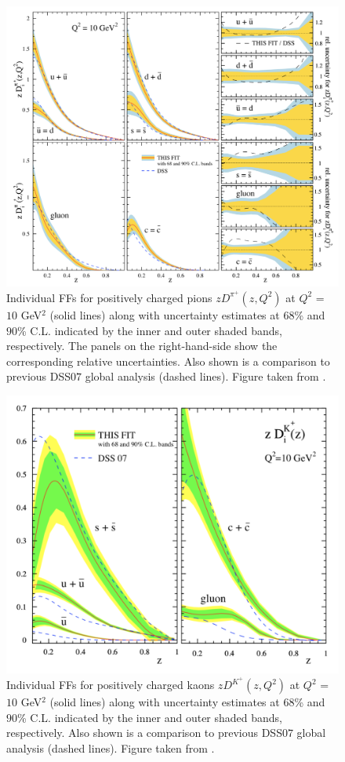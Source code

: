\begin{figure}[!h]
  \centering
	\includegraphics[scale=0.47]{./gfx/DSEHSPi.png}
	\caption{Individual FFs for positively charged pions $zD^{\pi^+}(z,Q^2)$ at $Q^2$ = $10$ GeV$^2$ (solid lines) along with uncertainty estimates at $68$\% and $90$\% C.L. indicated by the inner and outer shaded bands, respectively. The panels on the right-hand-side show the corresponding relative uncertainties. Also shown is a comparison to previous DSS$07$ global analysis \cite{DSS07} (dashed lines). Figure taken from \cite{DSEHS1}.}
	\label{pic:DSEHSPi}
\end{figure}

\begin{figure}[!h]
  \centering
	\includegraphics[scale=0.5]{./gfx/DSEHSK.png}
	\caption{Individual FFs for positively charged kaons $zD^{K^+}(z,Q^2)$ at $Q^2$ = $10$ GeV$^2$ (solid lines) along with uncertainty estimates at $68$\% and $90$\% C.L. indicated by the inner and outer shaded bands, respectively. Also shown is a comparison to previous DSS$07$ global analysis \cite{DSS07} (dashed lines). Figure taken from \cite{DSEHS2}.}
	\label{pic:DSEHSK}
\end{figure}

